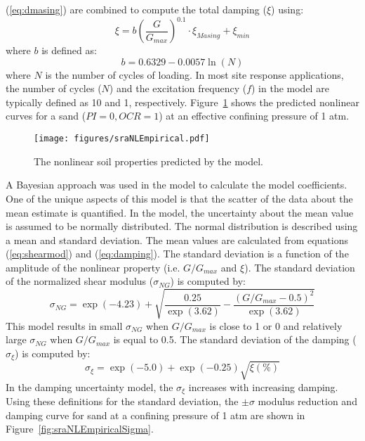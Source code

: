 \documentclass[11pt]{report}
\begin{document}
(\ref{eq:dmasing}) are combined to compute the total damping ($\xi$) using:
\begin{equation}
  \xi = b  \left( \frac{G}{G_{max}} \right)^{0.1} \cdot \xi_{Masing} + \xi_{min} 
  \label{eq:damping}
\end{equation}
where $b$ is defined as:
\begin{equation}
  b = 0.6329 - 0.0057 \ln\left( N \right)
\end{equation}
where $N$ is the number of cycles of loading.  In most site response applications, the number of
cycles ($N$) and the excitation frequency ($f$) in the model are typically defined as 10 and 1,
respectively.  Figure~\ref{fig:sraNLEmpirical} shows the predicted nonlinear curves for a sand
($PI=0, OCR=1$) at an effective confining pressure of 1 atm.

\begin{figure}[tb]
  \begin{center}
	\texttt{[image: figures/sraNLEmpirical.pdf]}
  \end{center}
  \caption{The nonlinear soil properties predicted by the \citet{darendeli:01} model.}
  \label{fig:sraNLEmpirical}
\end{figure}

A Bayesian approach was used in the \citet{darendeli:01} model to calculate the model coefficients.
One of the unique aspects of this model is that the scatter of the data about the mean estimate is
quantified.  In the \citet{darendeli:01} model, the uncertainty about the mean value is assumed to
be normally distributed.  The normal distribution is described using a mean and standard deviation.
The mean values are calculated from equations (\ref{eq:shearmod}) and (\ref{eq:damping}). The
standard deviation is a function of the amplitude of the nonlinear property (i.e. $G/G_{max}$ and
$\xi$).  The standard deviation of the normalized shear modulus ($\sigma_{NG}$) is computed by:
\begin{equation}
  \sigma_{NG} = \exp(-4.23) + \sqrt{ \frac{0.25}{\exp(3.62)} - \frac{\left(G/G_{max} -
  0.5\right)^2}{\exp(3.62)} }
  \label{eq:sigmaShear}
\end{equation}
This model results in small $\sigma_{NG}$ when $G/G_{max}$ is close to 1 or 0 and relatively large
$\sigma_{NG}$ when $G/G_{max}$ is equal to 0.5. The standard deviation of the damping
($\sigma_{\xi}$) is computed by:
\begin{equation}
  \sigma_{\xi} = \exp(-5.0) + \exp(-0.25) \sqrt{\xi (\%)}
  \label{eq:sigmaDamping}
\end{equation}
In the damping uncertainty model, the $\sigma_{\xi}$ increases with increasing damping.  Using these
definitions for the standard deviation, the $\pm\sigma$ modulus reduction and damping curve for sand
at a confining pressure of 1 atm are shown in Figure~\ref{fig:sraNLEmpiricalSigma}.
\end{document}
